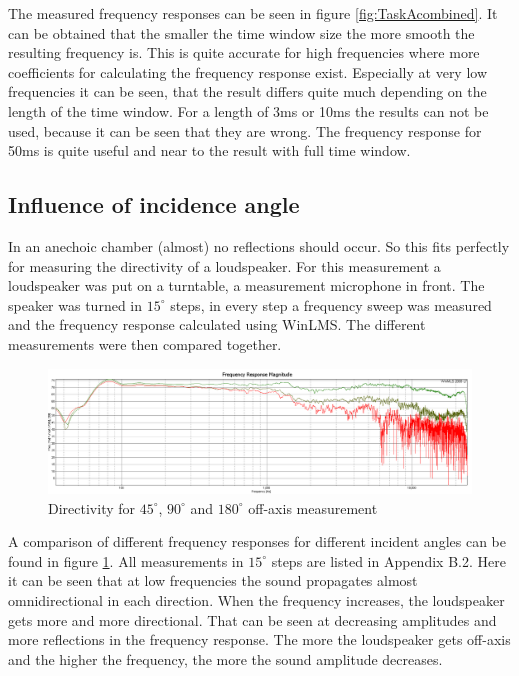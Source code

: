 \documentclass{article}
\begin{document}
The measured frequency responses can be seen in figure \ref{fig:TaskAcombined}.
It can be obtained that the smaller the time window size the more smooth the resulting frequency is. This is quite accurate for high frequencies where more coefficients for calculating the frequency response exist. Especially at very low frequencies it can be seen, that the result differs quite much depending on the length of the time window. For a length of 3ms or 10ms the results can not be used, because it can be seen that they are wrong. The frequency response for 50ms is quite useful and near to the result with full time window.
\subsection{Influence of incidence angle}
In an anechoic chamber (almost) no reflections should occur. So this fits perfectly for measuring the directivity of a loudspeaker. For this measurement a loudspeaker was put on a turntable, a measurement microphone in front. The speaker was turned in $15^\circ$ steps, in every step a frequency sweep was measured and the frequency response calculated using WinLMS. The different measurements were then compared together.\\
\begin{figure}[htbp]
\begin{center}
\includegraphics[width=15cm,keepaspectratio=true]{Figures/TaskBcomparison}
\caption{Directivity for $45^\circ$, $90^\circ$ and $180^\circ$ off-axis measurement}
\label{fig:TaskBcomparison}
\end{center}
\end{figure}
A comparison of different frequency responses for different incident angles can be found in figure \ref{fig:TaskBcomparison}. All measurements in $15^\circ$ steps are listed in Appendix B.2.
Here it can be seen that at low frequencies the sound propagates almost omnidirectional in each direction. When the frequency increases, the loudspeaker gets more and more directional. That can be seen at decreasing amplitudes and more reflections in the frequency response. The more the loudspeaker gets off-axis and the higher the frequency, the more the sound amplitude decreases.
\end{document}
